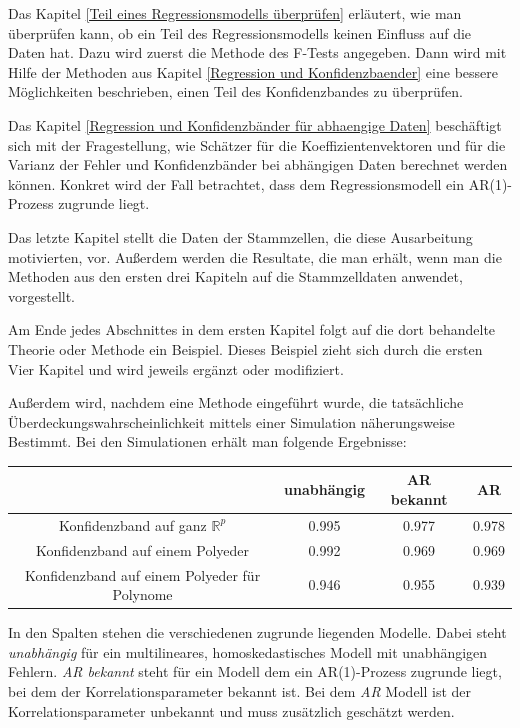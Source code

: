 \documentclass[12pt,a4paper]{article}
\theoremstyle{definition}
\theoremstyle{definition}
\theoremstyle{definition}
\theoremstyle{definition}
\newcommand{\UeberRR}{0.995}
\newcommand{\UeberRMinmax}{0.992}
\newcommand{\UeberRMinmaxPolyfast}{0.946}
\newcommand{\UeberARbekanntR}{0.977}
\newcommand{\UeberARbekanntMinmax}{0.969}
\newcommand{\UeberARbekanntMinmaxPolyfast}{0.955}
\newcommand{\UeberARR}{0.978}
\newcommand{\UeberARMinmax}{0.969}
\newcommand{\UeberARMinmaxPolyfast}{0.939}
\begin{document}
Das Kapitel \ref{Teil eines Regressionsmodells überprüfen} erläutert, wie man überprüfen kann, ob ein Teil des Regressionsmodells keinen Einfluss auf die Daten hat. Dazu wird zuerst die Methode des F-Tests angegeben. Dann wird mit Hilfe der Methoden aus Kapitel \ref{Regression und Konfidenzbaender} eine bessere Möglichkeiten beschrieben, einen Teil des Konfidenzbandes zu überprüfen.

Das Kapitel \ref{Regression und Konfidenzbänder für abhaengige Daten} beschäftigt sich mit der Fragestellung, wie Schätzer für die Koeffizientenvektoren und für die Varianz der Fehler und Konfidenzbänder bei abhängigen Daten berechnet werden können. Konkret wird der Fall betrachtet, dass dem Regressionsmodell ein AR(1)-Prozess zugrunde liegt.

Das letzte Kapitel stellt die Daten der Stammzellen, die diese Ausarbeitung motivierten, vor. Außerdem werden die Resultate, die man erhält, wenn man die Methoden aus den ersten drei Kapiteln auf die Stammzelldaten anwendet, vorgestellt.

Am Ende jedes Abschnittes in dem ersten Kapitel folgt auf die dort behandelte Theorie oder Methode ein Beispiel. Dieses Beispiel zieht sich durch die ersten Vier Kapitel und wird jeweils ergänzt oder modifiziert.

Außerdem wird, nachdem eine Methode eingeführt wurde, die tatsächliche Überdeckungswahrscheinlichkeit mittels einer Simulation näherungsweise Bestimmt. Bei den Simulationen erhält man folgende Ergebnisse:

\begin{center}
\begin{tabular}{|c|c|c|c|}
\hline 
 & unabhängig & AR bekannt & AR \\ 
\hline 
Konfidenzband auf ganz $\mathbb{R}^{p}$		 & \UeberRR		  & \UeberARbekanntR & \UeberARR \\ 
\hline 
Konfidenzband auf einem Polyeder	 & \UeberRMinmax  & \UeberARbekanntMinmax & \UeberARMinmax \\ 
\hline 
Konfidenzband auf einem Polyeder für Polynome  & \UeberRMinmaxPolyfast & \UeberARbekanntMinmaxPolyfast & \UeberARMinmaxPolyfast \\ 
\hline 
\end{tabular} 
\end{center}

In den Spalten stehen die verschiedenen zugrunde liegenden Modelle. Dabei steht \textit{unabhängig} für ein  multilineares, homoskedastisches Modell mit unabhängigen Fehlern. \textit{AR bekannt} steht für ein Modell dem ein AR(1)-Prozess zugrunde liegt, bei dem der Korrelationsparameter bekannt ist. Bei dem \textit{AR} Modell ist der Korrelationsparameter unbekannt und muss zusätzlich geschätzt werden.
\end{document}
